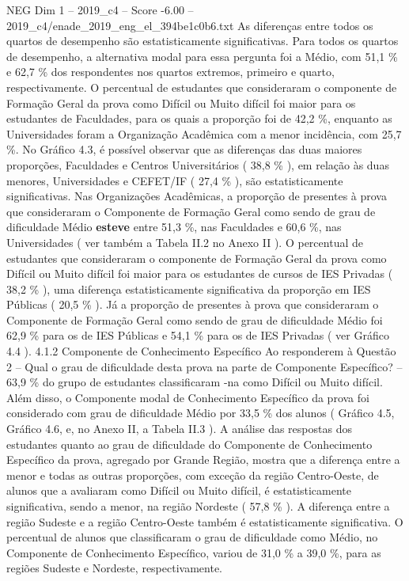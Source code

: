 \begin{textsample}{NEG Dim 1 – 2019\_c4 – Score -6.00 – 2019\_c4/enade\_2019\_eng\_el\_394be1c0b6.txt}
As diferenças entre todos os quartos de desempenho são estatisticamente significativas.
Para todos os quartos de desempenho, a alternativa modal para essa pergunta foi a Médio, com 51,1 \% e 62,7 \% dos respondentes nos quartos extremos, primeiro e quarto, respectivamente.
O percentual de estudantes que consideraram o componente de Formação Geral da prova como Difícil ou Muito difícil foi maior para os estudantes de Faculdades, para os quais a proporção foi de 42,2 \%, enquanto as Universidades foram a Organização Acadêmica com a menor incidência, com 25,7 \%.
No Gráfico 4.3, é possível observar que as diferenças das duas maiores proporções, Faculdades e Centros Universitários ( 38,8 \% ), em relação às duas menores, Universidades e CEFET/IF ( 27,4 \% ), são estatisticamente significativas.
Nas Organizações Acadêmicas, a proporção de presentes à prova que consideraram o Componente de Formação Geral como sendo de grau de dificuldade Médio \textbf{esteve} entre 51,3 \%, nas Faculdades e 60,6 \%, nas Universidades ( ver também a Tabela II.2 no Anexo II ).
O percentual de estudantes que consideraram o componente de Formação Geral da prova como Difícil ou Muito difícil foi maior para os estudantes de cursos de IES Privadas ( 38,2 \% ), uma diferença estatisticamente significativa da proporção em IES Públicas ( 20,5 \% ).
Já a proporção de presentes à prova que consideraram o Componente de Formação Geral como sendo de grau de dificuldade Médio foi 62,9 \% para os de IES Públicas e 54,1 \% para os de IES Privadas ( ver Gráfico 4.4 ). 4.1.2 Componente de Conhecimento Específico Ao responderem à Questão 2 – Qual o grau de dificuldade desta prova na parte de Componente Específico? – 63,9 \% do grupo de estudantes classificaram -na como Difícil ou Muito difícil.
Além disso, o Componente modal de Conhecimento Específico da prova foi considerado com grau de dificuldade Médio por 33,5 \% dos alunos ( Gráfico 4.5, Gráfico 4.6, e, no Anexo II, a Tabela II.3 ).
A análise das respostas dos estudantes quanto ao grau de dificuldade do Componente de Conhecimento Específico da prova, agregado por Grande Região, mostra que a diferença entre a menor e todas as outras proporções, com exceção da região Centro-Oeste, de alunos que a avaliaram como Difícil ou Muito difícil, é estatisticamente significativa, sendo a menor, na região Nordeste ( 57,8 \% ).
A diferença entre a região Sudeste e a região Centro-Oeste também é estatisticamente significativa.
O percentual de alunos que classificaram o grau de dificuldade como Médio, no Componente de Conhecimento Específico, variou de 31,0 \% a 39,0 \%, para as regiões Sudeste e Nordeste, respectivamente.

\end{textsample}
